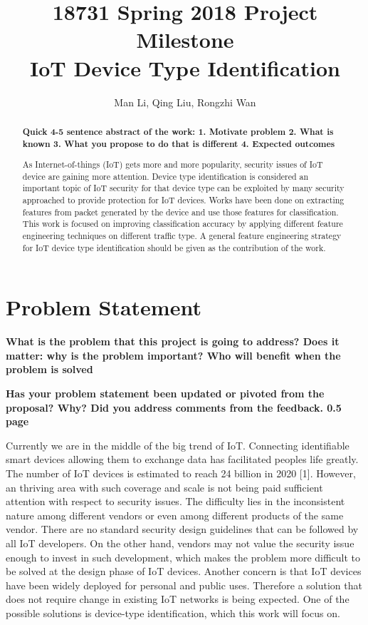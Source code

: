 \documentclass[twocolumn,10pt]{article}
\begin{document}
	\title{18731 Spring 2018 Project Milestone\\ IoT Device Type Identification} 
	
\author{
Man Li, Qing Liu, Rongzhi Wan
  }

\maketitle

\begin{abstract}

{\bf Quick 4-5 sentence abstract of the work: 1. Motivate problem 2. What is known 3. What you propose to do that is different 4. Expected outcomes}

As Internet-of-things (IoT) gets more and more popularity, security issues of IoT device are gaining more attention. Device type identification is considered an important topic of IoT security for that device type can be exploited by many security approached to provide protection for IoT devices. Works have been done on extracting features from packet generated by the device and use those features for classification. This work is focused on improving classification accuracy by applying different feature engineering techniques on different traffic type. A general feature engineering strategy for IoT device type identification should be given as the contribution of the work.
\end{abstract}


\section{Problem Statement}

{\bf What is the problem that this project is going to address?
Does it matter: why is the problem important? Who will
benefit when the problem is solved}

{\bf Has your problem statement been updated or pivoted from the proposal? Why? Did you address comments 
from the feedback. 0.5 page}

Currently we are in the middle of the big trend of IoT. Connecting identifiable smart devices allowing them to exchange data has facilitated peoples life greatly. The number of IoT devices is estimated to reach 24 billion in 2020 [1]. However, an thriving area with such coverage and scale is not being paid sufficient attention with respect to security issues. The difficulty lies
in the inconsistent nature among different vendors or even among different products of the same vendor. There are no standard security design guidelines that can be followed by all IoT developers. On the other hand, vendors may not value the security issue enough to invest in such development, which makes the problem more difficult to be solved at the design phase of IoT devices. Another concern is that IoT devices have been widely deployed for personal and public uses. Therefore a solution that does not require change in existing IoT networks is being expected. One of the possible solutions is device-type identification, which this work will focus on.
\end{document}
